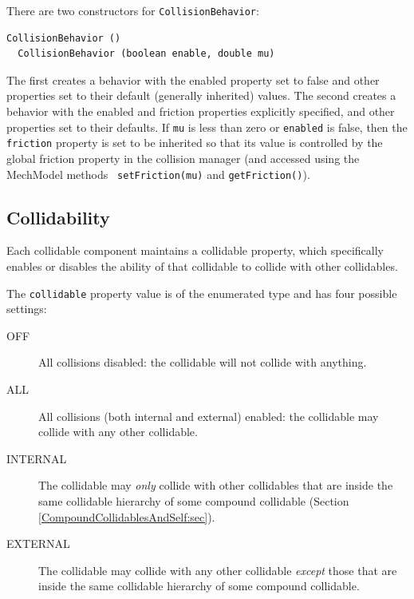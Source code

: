 There are two constructors for {\tt CollisionBehavior}:
%
\begin{lstlisting}[]
  CollisionBehavior ()
  CollisionBehavior (boolean enable, double mu)
\end{lstlisting}
%
The first creates a behavior with the {\sf enabled} property set to
false and other properties set to their default (generally inherited)
values.  The second creates a behavior with the {\sf enabled} and {\sf
friction} properties explicitly specified, and other properties set to
their defaults.  If {\tt mu} is less than zero or {\tt enabled} is
false, then the {\tt friction} property is set to be inherited so that
its value is controlled by the global friction property in the
collision manager (and accessed using the MechModel methods {\tt
setFriction(mu)} and {\tt getFriction()}).

\subsection{Collidability}
\label{collidability:sec}

Each collidable component maintains a {\sf collidable} property,
which specifically enables or disables the ability of that collidable
to collide with other collidables.

The {\tt collidable} property value is of the enumerated type
 and
has four possible settings:

\begin{description}

\item[OFF]\mbox{}

All collisions disabled: the collidable will not collide with
anything.

\item[ALL]\mbox{}

All collisions (both internal and external) enabled: the collidable
may collide with any other collidable.

\item[INTERNAL]\mbox{}

The collidable may {\it only} collide with other collidables that are
inside the same collidable hierarchy of some compound collidable
(Section \ref{CompoundCollidablesAndSelf:sec}).

\item[EXTERNAL]\mbox{}

The collidable may collide with any other collidable {\it except}
those that are inside the same collidable hierarchy of some compound
collidable.

\end{description}

